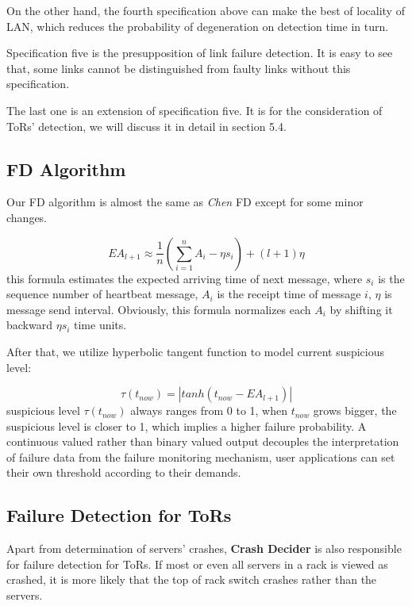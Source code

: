 \documentclass{sig-alternate-05-2015}
\begin{document}
On the other hand, the fourth specification above can make the best of locality of LAN, which reduces the probability of degeneration on detection time in turn.

Specification five is the presupposition of link failure detection. It is easy to see that, some links cannot be distinguished from faulty links without this specification.

The last one is an extension of specification five. It is for the consideration of ToRs' detection, we will discuss it in detail in section 5.4.

\subsection{FD Algorithm}
Our FD algorithm is almost the same as \textit{Chen} FD \cite{chen2002quality} except for some minor changes.

\begin{equation}
EA_{l+1} \approx \frac{1}{n}(\sum_{i=1}^{n}A_i - \eta s_i)+(l+1)\eta
\end{equation}
this formula estimates the expected arriving time of next message, where $s_i$ is the sequence number of heartbeat message, $A_i$ is the receipt time of message $i$, $\eta$ is message send interval. Obviously, this formula normalizes each $A_i$ by shifting it backward $\eta s_i$ time units.

After that, we utilize hyperbolic tangent function to model current suspicious level:

\begin{equation}
\tau(t_{now}) = |tanh(t_{now}-EA_{l+1})|
\end{equation}
suspicious level $\tau(t_{now})$ always ranges from 0 to 1, when $t_{now}$ grows bigger, the suspicious level is closer to 1, which implies a higher failure probability. A continuous valued rather than binary valued output decouples the interpretation of failure data from the failure monitoring mechanism, user applications can set their own threshold according to their demands.

\subsection{Failure Detection for ToRs}
Apart from determination of servers' crashes, \textbf{Crash Decider} is also responsible for failure detection for ToRs. If most or even all servers in a rack is viewed as crashed, it is more likely that the top of rack switch crashes rather than the servers.
\end{document}
